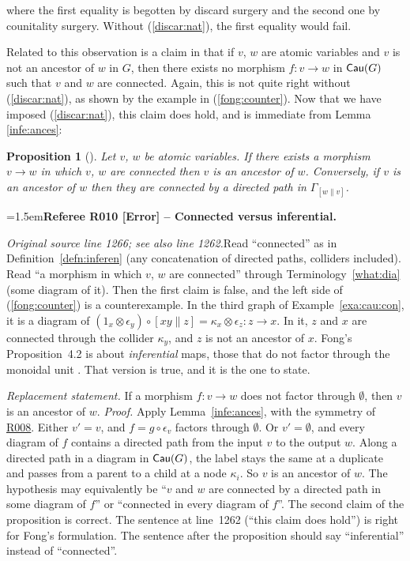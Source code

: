 \documentclass[12pt]{amsart}
\newcommand{\RefereeRemark}[4]{%
  \par\medskip\begingroup\normalfont\small\color{RefereePurple}%
  \emergencystretch=1.5em\noindent\textbf{Referee R#1 [#2] -- #3.}\par\nobreak\noindent #4\par
  \endgroup\medskip
}
\theoremstyle{plain}
\newtheorem{prop}[thm]{Proposition}
\theoremstyle{definition}
\theoremstyle{remark}
\numberwithin{equation}{section}
\theoremstyle{plain}
\newcommand{\0}{\emptyset}
\newcommand{\fun}{\longrightarrow}
\newcommand{\cat}[1]{\textup{\textsf{#1}}}
\DeclareMathOperator{\cau}{\sf{Cau}}
\newcommand{\stri}{\Gamma}
\begin{document}
where the first equality is begotten by discard surgery  and the second one by counitality surgery. Without (\ref{discar:nat}), the first equality would fail.

Related to this observation is a claim in \cite[Proposition~4.2]{Fong:thesis} that if $v$, $w$ are atomic variables and $v$ is not an ancestor of $w$ in $G$, then there exists no morphism $f: v \fun w$ in $\cat{Cau}(G)$ such that $v$ and $w$ are connected. Again, this is not quite right without (\ref{discar:nat}), as shown by the example in (\ref{fong:counter}). Now that we have imposed (\ref{discar:nat}), this claim does hold, and is immediate from Lemma \ref{infe:ances}:

\begin{prop}[\cite{Fong:thesis}]
\label{connect:ancestral}
Let $v$, $w$ be atomic variables. If there exists a morphism $v \fun w$ in which $v$, $w$ are connected then $v$ is an ancestor of $w$. Conversely, if $v$ is an ancestor of $w$ then they are connected by a directed path in $\stri_{[w \| v]}$.
\end{prop}
\hypertarget{review-010}{}\RefereeRemark{010}{Error}{Connected versus inferential}{%
\textit{Original source line 1266; see also line 1262.}\quad Read ``connected'' as in Definition~\ref{defn:inferen} (any concatenation of directed paths, colliders included). Read ``a morphism in which $v$, $w$ are connected'' through Terminology~\ref{what:dia} (some diagram of it). Then the first claim is false, and the left side of (\ref{fong:counter}) is a counterexample. In the third graph of Example~\ref{exa:cau:con}, it is a diagram of $(1_x \otimes \epsilon_y) \circ [xy \| z] = \kappa_x \otimes \epsilon_z : z \fun x$. In it, $z$ and $x$ are connected through the collider $\kappa_y$, and $z$ is not an ancestor of $x$. Fong's Proposition~4.2 is about \emph{inferential} maps, those that do not factor through the monoidal unit \cite[p.~43]{Fong:thesis}. That version is true, and it is the one to state.
\par\smallskip\emph{Replacement statement.} If a morphism $f : v \fun w$ does not factor through $\0$, then $v$ is an ancestor of $w$. \emph{Proof.} Apply Lemma~\ref{infe:ances}, with the symmetry of \hyperlink{review-008}{R008}. Either $v' = v$, and $f = g \circ \epsilon_v$ factors through $\0$. Or $v' = \0$, and every diagram of $f$ contains a directed path from the input $v$ to the output $w$. Along a directed path in a diagram in $\cau(G)$, the label stays the same at a duplicate and passes from a parent to a child at a node $\kappa_i$. So $v$ is an ancestor of $w$. The hypothesis may equivalently be ``$v$ and $w$ are connected by a directed path in some diagram of $f$'' or ``connected in every diagram of $f$''. The second claim of the proposition is correct. The sentence at line~1262 (``this claim does hold'') is right for Fong's formulation. The sentence after the proposition should say ``inferential'' instead of ``connected''.
}
\end{document}
